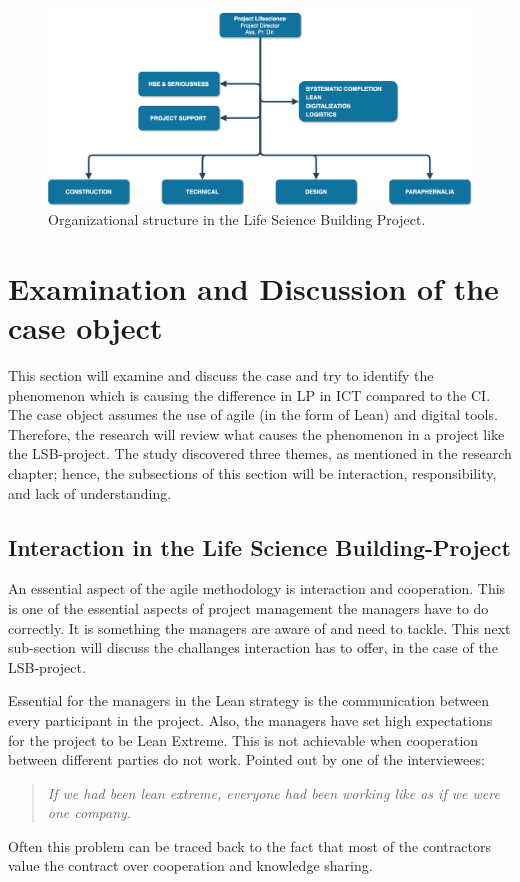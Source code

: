 \begin{figure}
    \centering
    \includegraphics[width=\textwidth]{fig/lvb_diagram.png}
    \caption{Organizational structure in the Life Science Building Project.}
    \label{fig:project_structure}
\end{figure}

\section{Examination and Discussion of the case object}
This section will examine and discuss the case and try to identify the phenomenon which is causing the difference in LP in ICT compared to the CI. The case object assumes the use of agile (in the form of Lean) and digital tools. Therefore, the research will review what causes the phenomenon in a project like the LSB-project. The study discovered three themes, as mentioned in the research chapter; hence, the subsections of this section will be interaction, responsibility, and lack of understanding.

\subsection{Interaction in the Life Science Building-Project}
An essential aspect of the agile methodology is interaction and cooperation. This is one of the essential aspects of project management the managers have to do correctly. It is something the managers are aware of and need to tackle. This next sub-section will discuss the challanges interaction has to offer, in the case of the LSB-project.

Essential for the managers in the Lean strategy is the communication between every participant in the project. Also, the managers have set high expectations for the project to be Lean Extreme. This is not achievable when cooperation between different parties do not work. Pointed out by one of the interviewees:
\begin{quote}
    \textit{If we had been lean extreme, everyone had been working like as if we were one company.}
\end{quote}
Often this problem can be traced back to the fact that most of the contractors value the contract over cooperation and knowledge sharing. 

